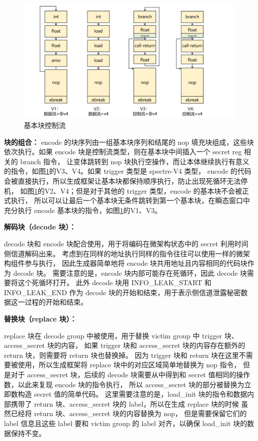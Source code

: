 \begin{figure}[!h]
    \centering
    \includegraphics[width=\linewidth]{figure/paper/encode-consist.png}
    \caption{基本块控制流}
    \label{paper:encode-consist}
\end{figure}

\textbf{块的组合：}
encode 的块序列由一组基本块序列和结尾的 nop 填充块组成，这些块依次执行。如果 encode 块是控制流类型，则在基本块中间插入一个 secret reg 相关的 branch 指令，
让变体跳转到 nop 块执行空操作，而让本体继续执行有意义的指令，如图\ref{paper:encode-consist}的V3、V4。如果 trigger 类型是 spectre-V4 类型，
encode 的代码会被直接执行，所以生成框架让基本块都保持顺序执行，防止出现死循环无法停机，
如图\ref{paper:encode-consist}的V2、V4；但是对于其他的 trigger 类型，encode 的基本块不会被正式执行，
所以可以让最后一个基本块无条件跳转到第一个基本块，在瞬态窗口中充分执行 encode 基本块的指令，如图\ref{paper:encode-consist}的V1、V3。\par

\textbf{解码块（decode 块）：}\par
decode 块和 encode 块配合使用，用于将编码在微架构状态中的 secret 利用时间侧信道解码出来。
考虑到在同样的地址执行同样的指令往往可以使用一样的微架构组件参与执行，
因此生成器简单地将 encode 块共用地址且内容相同的代码块作为 decode 块。
需要注意的是，encode 块内部可能存在死循环，因此 decode 块需要将这个死循环打开。
此外 decode 块用 INFO\_LEAK\_START 和 INFO\_LEAK\_END 作为
decode 块的开始和结束，用于表示侧信道泄露秘密数据这一过程的开始和结束。\par

\textbf{替换块（replace 块）：}\par
replace 块在 decode group 中被使用，用于替换 victim group 中 trigger 块、access\_secret 块的内容，
如果 trigger 块和 access\_secret 块的内容存在额外的 return 块，则需要将 return 块也替换掉。
因为 trigger 块和 return 块在这里不需要被使用，所以生成框架将 replace 块中的对应区域简单地替换为 nop 指令，
但是对于 access\_secret 块，后续的 decode 块需要从中得到和 secret 值相同的操作数，以此来复现 encode 块的指令执行，
所以 access\_secret 块的部分被替换为立即数构造 secret 值的简单代码。
这里需要注意的是，load\_init 块的指令和数据内部携带了 return 块、access\_secret 块的 label，所以在生成 replace 块的时候
虽然已经将 return 块、access\_secret 块的内容替换为 nop，
但是需要保留它们的 label 信息且这些 label 要和 victim group 的 label 对齐，以确保 load\_init 块的数据保持不变。\par

